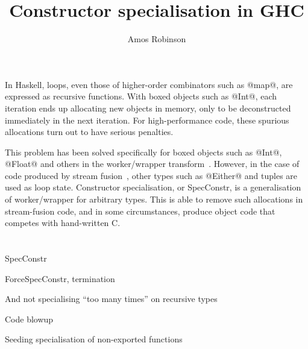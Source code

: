 \documentclass{tmr}
\title{Constructor specialisation in GHC}
\author{Amos Robinson\email{amosr@cse.unsw.edu.au}}
\begin{document}
\makeatactive

\begin{introduction}
In Haskell, loops, even those of higher-order combinators such as @map@, are expressed as recursive functions. 
With boxed objects such as @Int@, each iteration ends up allocating new objects in memory, only to be deconstructed immediately in the next iteration.
For high-performance code, these spurious allocations turn out to have serious penalties.

This problem has been solved specifically for boxed objects such as @Int@, @Float@ and others in the worker/wrapper transform~\CITE.
However, in the case of code produced by stream fusion~\CITE, other types such as @Either@ and tuples are used as loop state.
Constructor specialisation, or SpecConstr, is a generalisation of worker/wrapper for arbitrary types.
This is able to remove such allocations in stream-fusion code, and in some circumstances, produce object code that competes with hand-written C.
\end{introduction}

\section{}

SpecConstr

ForceSpecConstr, termination

And not specialising ``too many times'' on recursive types

Code blowup

Seeding specialisation of non-exported functions
\end{document}

